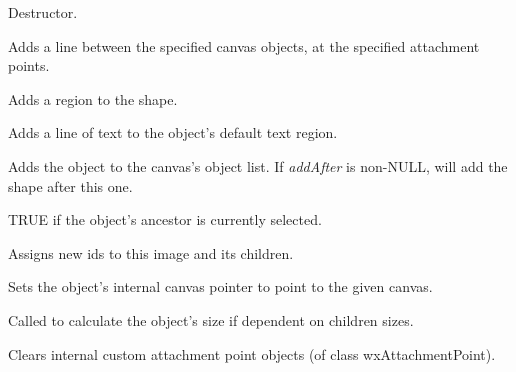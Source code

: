 Destructor.



Adds a line between the specified canvas objects, at the specified attachment points.



Adds a region to the shape.



Adds a line of text to the object's default text region.



Adds the object to the canvas's object list. If {\it addAfter} is
non-NULL, will add the shape after this one.



TRUE if the object's ancestor is currently selected.



Assigns new ids to this image and its children.



Sets the object's internal canvas pointer to point to the given canvas.



Called to calculate the object's size if dependent on children sizes.



Clears internal custom attachment point objects (of class wxAttachmentPoint).

